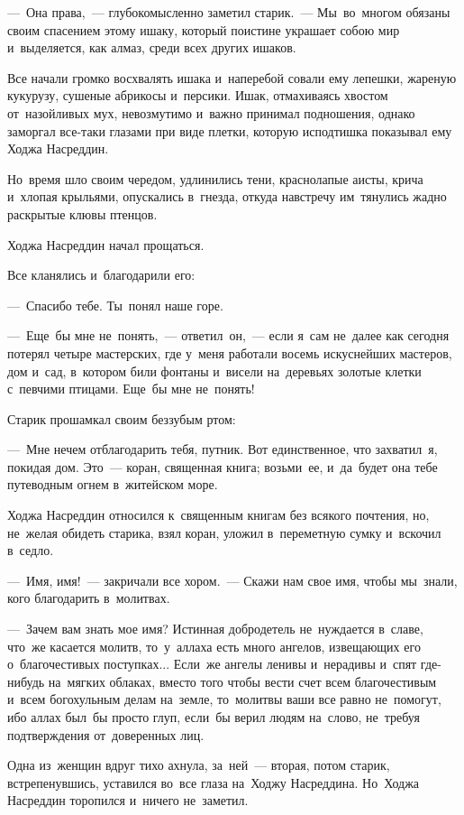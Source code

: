 \documentclass[12pt,a4paper]{book}
\begin{document}
—~Она права,~— глубокомысленно заметил старик.~— Мы~во~многом обязаны своим спасением этому ишаку, который поистине украшает собою мир и~выделяется, как алмаз, среди всех других ишаков.

Все начали громко восхвалять ишака и~наперебой совали ему лепешки, жареную кукурузу, сушеные абрикосы и~персики. Ишак, отмахиваясь хвостом от~назойливых мух, невозмутимо и~важно принимал подношения, однако заморгал все-таки глазами при виде плетки, которую исподтишка показывал ему Ходжа Насреддин.

Но~время шло своим чередом, удлинились тени, краснолапые аисты, крича и~хлопая крыльями, опускались в~гнезда, откуда навстречу им~тянулись жадно раскрытые клювы птенцов.

Ходжа Насреддин начал прощаться.

Все кланялись и~благодарили его:

—~Спасибо тебе. Ты~понял наше горе.

—~Еще~бы мне не~понять,~— ответил~он,~— если я~сам не~далее как сегодня потерял четыре мастерских, где у~меня работали восемь искуснейших мастеров, дом и~сад, в~котором били фонтаны и~висели на~деревьях золотые клетки с~певчими птицами. Еще~бы мне не~понять!

Старик прошамкал своим беззубым ртом:

—~Мне нечем отблагодарить тебя, путник. Вот единственное, что захватил~я, покидая дом. Это~— коран, священная книга; возьми~ее, и~да~будет она тебе путеводным огнем в~житейском море.

Ходжа Насреддин относился к~священным книгам без всякого почтения, но, не~желая обидеть старика, взял коран, уложил в~переметную сумку и~вскочил в~седло.

—~Имя, имя!~— закричали все хором.~— Скажи нам свое имя, чтобы мы~знали, кого благодарить в~молитвах.

—~Зачем вам знать мое имя? Истинная добродетель не~нуждается в~славе, что~же касается молитв, то~у~аллаха есть много ангелов, извещающих его о~благочестивых поступках... Если~же ангелы ленивы и~нерадивы и~спят где-нибудь на~мягких облаках, вместо того чтобы вести счет всем благочестивым и~всем богохульным делам на~земле, то~молитвы ваши все равно не~помогут, ибо аллах был~бы просто глуп, если~бы верил людям на~слово, не~требуя подтверждения от~доверенных лиц.

Одна из~женщин вдруг тихо ахнула, за~ней~— вторая, потом старик, встрепенувшись, уставился во~все глаза на~Ходжу Насреддина. Но~Ходжа Насреддин торопился и~ничего не~заметил.
\end{document}
